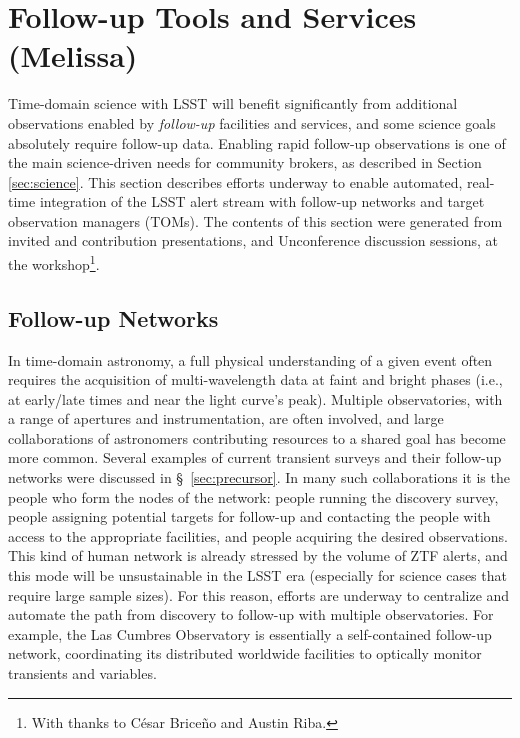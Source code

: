 \section{Follow-up Tools and Services (Melissa)} \label{sec:followup}



Time-domain science with  {LSST} will benefit significantly from additional observations enabled by \emph{follow-up} facilities and services, and some science goals absolutely require follow-up data.
Enabling rapid follow-up observations is one of the main science-driven needs for community brokers, as described in Section \ref{sec:science}.
This section describes efforts underway to enable automated, real-time integration of the  {LSST} alert stream with follow-up networks and target observation managers (TOMs).
The contents of this section were generated from invited and contribution presentations, and Unconference discussion sessions, at the workshop\footnote{With thanks to César Briceño and Austin Riba.}.

\subsection{Follow-up Networks}\label{ssec:followup_networks}

In time-domain astronomy, a full physical understanding of a given event often requires the acquisition of multi-wavelength data at faint and bright phases (i.e., at early/late times and near the light curve's peak).
Multiple observatories, with a range of apertures and instrumentation, are often involved, and large collaborations of astronomers contributing resources to a shared goal has become more common.
Several examples of current  {transient} surveys and their follow-up networks were discussed in \S~\ref{sec:precursor}.
In many such collaborations it is the people who form the nodes of the network: people running the discovery survey, people assigning potential targets for follow-up and contacting the people with access to the appropriate facilities, and people acquiring the desired observations.
This kind of human network is already stressed by the volume of  {ZTF} alerts, and this mode will be unsustainable in the  {LSST} era (especially for science cases that require large sample sizes).
For this reason, efforts are underway to centralize and automate the path from discovery to follow-up with multiple observatories.
For example, the Las Cumbres Observatory is essentially a self-contained follow-up network, coordinating its distributed worldwide facilities to optically monitor transients and variables.

